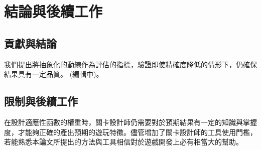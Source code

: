 \chapter{結論與後續工作}
\label{cha:conclusions}

\section{貢獻與結論}

我們提出將抽象化的動線作為評估的指標，驗證即使精確度降低的情形下，仍確保結果具有一定品質。 (編輯中)。

\section{限制與後續工作} 

在設計適應性函數的權重時，關卡設計師仍需要對於預期結果有一定的知識與掌握度，才能夠正確的產出預期的遊玩特徵。儘管增加了關卡設計師的工具使用門檻，若能熟悉本論文所提出的方法與工具相信對於遊戲開發上必有相當大的幫助。
